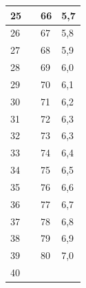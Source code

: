 \documentclass[12pt]{article}
\begin{document}
\begin{longtable}{|p{2cm}|p{2cm}|p{2cm}|p{2cm}|}
25	&\color{red}{2,6}	&66	&5,7\\ \hline
26	&\color{red}{2,6}	&67	&5,8\\ \hline
27	&\color{red}{2,7}	&68	&5,9\\ \hline
28	&\color{red}{2,8}	&69	&6,0\\ \hline
29	&\color{red}{2,8}	&70	&6,1\\ \hline
30	&\color{red}{2,9}	&71	&6,2\\ \hline
31	&\color{red}{2,9}	&72	&6,3\\ \hline
32	&\color{red}{3,0}	&73	&6,3\\ \hline
33	&\color{red}{3,1}	&74	&6,4\\ \hline
34	&\color{red}{3,1}	&75	&6,5\\ \hline
35	&\color{red}{3,2}	&76	&6,6\\ \hline
36	&\color{red}{3,3}	&77	&6,7\\ \hline
37	&\color{red}{3,3}	&78	&6,8\\ \hline
38	&\color{red}{3,4}	&79	&6,9\\ \hline
39	&\color{red}{3,4}	&80	&7,0\\ \hline
40	&\color{red}{3,5}	&	&\\ \hline
\end{longtable}
\end{document}
